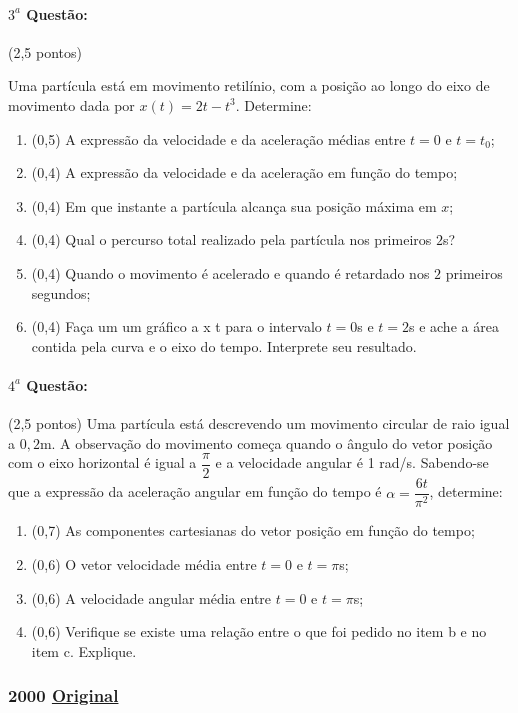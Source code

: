 \documentclass[12pt,a4paper]{article}
\newcommand{\original}[1]{\tiny \href{#1}{Original} \normalsize}
\begin{document}
\paragraph{$3^a$ Questão:} (2,5 pontos)

Uma partícula está em movimento retilínio, com a posição ao longo do eixo de movimento dada por $x(t)=2t-t^3$. Determine:
\begin{enumerate}[label=\alph*)]
\item (0,5) A expressão da velocidade e da aceleração médias entre $t=0$ e $t=t_0$;
\item (0,4) A expressão da velocidade e da aceleração em função do tempo;
\item (0,4) Em que instante a partícula alcança sua posição máxima em $x$;
\item (0,4) Qual o percurso total realizado pela partícula nos primeiros $2$s?
\item (0,4) Quando o movimento é acelerado e quando é retardado nos $2$ primeiros segundos;
\item (0,4) Faça um um gráfico a x t para o intervalo $t=0$s e $t=2$s e ache a área contida pela curva e o eixo do tempo. Interprete seu resultado.
\end{enumerate}

\paragraph{$4^a$ Questão:} (2,5 pontos)
Uma partícula está descrevendo um movimento circular de raio igual a $0,2$m. A observação do movimento começa quando o ângulo do vetor posição com o eixo horizontal
é igual a $\dfrac{\pi}{2}$ e a velocidade angular é 1 rad/s. Sabendo-se que a expressão da aceleração angular em função do tempo é $\alpha = \dfrac{6t}{\pi^2}$, determine:
\begin{enumerate}[label=\alph*)]
\item (0,7) As componentes cartesianas do vetor posição em função do tempo;
\item (0,6) O vetor velocidade média entre $t=0$ e $t=\pi$s;
\item (0,6) A velocidade angular média entre $t=0$ e $t=\pi$s;
\item (0,6) Verifique se existe uma relação entre o que foi pedido no item b e no item c. Explique.
\end{enumerate}
\newpage

\subsubsection{2000 \original{https://drive.google.com/open?id=1lD7Uc8_U7N-28f1SKEfbNLuzuwJVp0zs}}
\end{document}
